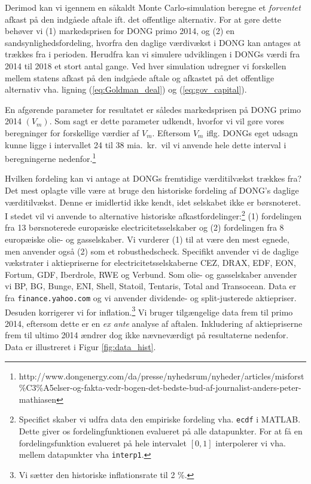 \documentclass{article}
\begin{document}
Derimod kan vi igennem en såkaldt Monte Carlo-simulation beregne et \emph{forventet} afkast på den indgåede aftale ift. det offentlige alternativ. For at gøre dette behøver vi (1) markedsprisen for DONG primo 2014, og (2) en sandsynlighedsfordeling, hvorfra den daglige værdivækst i DONG kan antages at trækkes fra i perioden. Herudfra kan vi simulere udviklingen i DONGs værdi fra 2014 til 2018 et stort antal gange. Ved hver simulation udregner vi forskellen mellem statens afkast på den indgåede aftale og afkastet på det offentlige alternativ vha. ligning (\ref{eq:Goldman_deal}) og (\ref{eq:gov_capital}).

En afgørende parameter for resultatet er således markedsprisen på DONG primo 2014 $(V_m)$. Som sagt er dette parameter udkendt, hvorfor vi vil gøre vores beregninger for forskellige værdier af $V_m$. Eftersom $V_m$ iflg. DONGs eget udsagn kunne ligge i intervallet 24 til 38 mia.\ kr.\ vil vi anvende hele dette interval i beregningerne nedenfor.\footnote{http://www.dongenergy.com/da/presse/nyhedsrum/nyheder/articles/misforst\%C3\%A5elser-og-fakta-vedr-bogen-det-bedste-bud-af-journalist-anders-peter-mathiasen}

Hvilken fordeling kan vi antage at DONGs fremtidige værditilvækst trækkes fra? Det mest oplagte ville være at bruge den historiske fordeling af DONG's daglige værditilvækst. Denne er imidlertid ikke kendt, idet selskabet ikke er børsnoteret. I stedet vil vi anvende to alternative historiske afkastfordelinger:\footnote{Specifict skaber vi udfra data den empiriske fordeling vha. \texttt{ecdf} i MATLAB. Dette giver os fordelingfunktionen evalueret på alle datapunkter. For at få en fordelingsfunktion evalueret på hele intervalet $[0,1]$ interpolerer vi vha. mellem datapunkter vha \texttt{interp1}.} (1)  fordelingen fra 13 børsnoterede europæiske electricitetsselskaber og (2) fordelingen fra 8 europæiske olie- og gasselskaber. Vi vurderer (1) til at være den mest egnede, men anvender også (2) som et robusthedscheck. Specifikt anvender vi de daglige vækstrater i aktiepriserne for electricitetsselskaberne CEZ, DRAX, EDF, EON, Fortum, GDF, Iberdrole, RWE og Verbund. Som olie- og gasselskaber anvender vi BP, BG, Bunge, ENI, Shell, Statoil, Tentaris, Total and Transocean. Data er fra \texttt{finance.yahoo.com} og vi anvender dividende- og split-justerede aktiepriser. Desuden korrigerer vi for inflation.\footnote{Vi sætter den historiske inflationsrate til 2 \%.} Vi bruger tilgængelige data frem til primo 2014, eftersom dette er en \emph{ex ante} analyse af aftalen. Inkludering af aktiepriserne frem til ultimo 2014 ændrer dog ikke nævneværdigt på resultaterne nedenfor. Data er illustreret i Figur \ref{fig:data_hist}.
\end{document}
